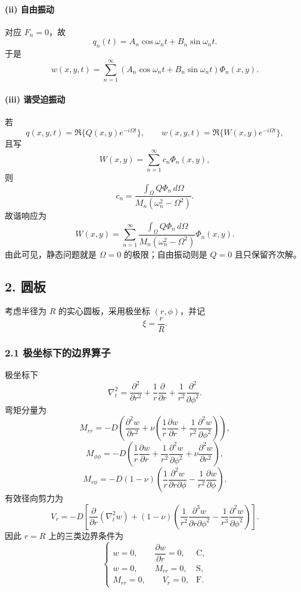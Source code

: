 \documentclass[12pt]{ctexart}
\begin{document}
\paragraph{(ii) 自由振动}
对应 \(F_n=0\)，故
\[
q_n(t)=A_n\cos\omega_n t+B_n\sin\omega_n t.
\]
于是
\[
w(x,y,t)=\sum_{n=1}^\infty \left(A_n\cos\omega_n t+B_n\sin\omega_n t\right)\Phi_n(x,y).
\]

\paragraph{(iii) 谐受迫振动}
若
\[
q(x,y,t)=\Re\{Q(x,y)e^{-i\Omega t}\},
\qquad
w(x,y,t)=\Re\{W(x,y)e^{-i\Omega t}\},
\]
且写
\[
W(x,y)=\sum_{n=1}^\infty c_n \Phi_n(x,y),
\]
则
\[
c_n=
\frac{\displaystyle \int_\Omega Q\Phi_n\, d\Omega}
{M_n(\omega_n^2-\Omega^2)}.
\]
故谐响应为
\[
W(x,y)=
\sum_{n=1}^\infty
\frac{\displaystyle \int_\Omega Q\Phi_n\, d\Omega}
{M_n(\omega_n^2-\Omega^2)}
\Phi_n(x,y).
\]
由此可见，静态问题就是 \(\Omega=0\) 的极限；自由振动则是 \(Q=0\) 且只保留齐次解。

\subsection*{2. 圆板}

考虑半径为 \(R\) 的实心圆板，采用极坐标 \((r,\phi)\)，并记
\[
\xi=\frac{r}{R}.
\]

\subsubsection*{2.1 极坐标下的边界算子}
极坐标下
\[
\nabla_t^2
=
\frac{\partial^2}{\partial r^2}
+\frac{1}{r}\frac{\partial}{\partial r}
+\frac{1}{r^2}\frac{\partial^2}{\partial \phi^2}.
\]
弯矩分量为
\[
M_{rr}
=
-D\left(
\frac{\partial^2 w}{\partial r^2}
+\nu\left(
\frac{1}{r}\frac{\partial w}{\partial r}
+\frac{1}{r^2}\frac{\partial^2 w}{\partial \phi^2}
\right)\right),
\]
\[
M_{\phi\phi}
=
-D\left(
\frac{1}{r}\frac{\partial w}{\partial r}
+\frac{1}{r^2}\frac{\partial^2 w}{\partial \phi^2}
+\nu \frac{\partial^2 w}{\partial r^2}
\right),
\]
\[
M_{r\phi}
=
-D(1-\nu)\left(
\frac{1}{r}\frac{\partial^2 w}{\partial r\partial \phi}
-\frac{1}{r^2}\frac{\partial w}{\partial \phi}
\right).
\]
有效径向剪力为
\[
V_r
=
-D\left[
\frac{\partial}{\partial r}\left(\nabla_t^2 w\right)
+
(1-\nu)\left(
\frac{1}{r^2}\frac{\partial^3 w}{\partial r\partial \phi^2}
-\frac{1}{r^3}\frac{\partial^2 w}{\partial \phi^2}
\right)
\right].
\]
因此 \(r=R\) 上的三类边界条件为
\[
\begin{cases}
w=0,\qquad \dfrac{\partial w}{\partial r}=0, & \text{C},\\[8pt]
w=0,\qquad M_{rr}=0, & \text{S},\\[8pt]
M_{rr}=0,\qquad V_r=0, & \text{F}.
\end{cases}
\]
\end{document}

